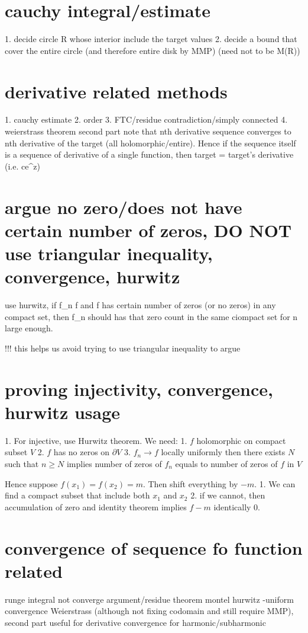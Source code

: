 	
	

\section*{cauchy integral/estimate}
1. decide circle R whose interior include the target values
2. decide a bound that cover the entire circle (and therefore entire disk by MMP) (need not to be M(R))

\section*{derivative related methods}
1. cauchy estimate
2. order
3. FTC/residue contradiction/simply connected
4. weierstrass theorem second part 
   note that nth derivative sequence converges to nth derivative of the target (all holomorphic/entire). Hence if the sequence itself is a sequence of derivative of a single function, then target = target's derivative (i.e. ce^z)
   
   
\section*{argue no zero/does not have certain number of zeros, DO NOT use triangular inequality, convergence, hurwitz}
use hurwitz, if f_n \to f and f has certain number of zeros (or no zeros) in any compact set, then f_n should has that zero count in the same ciompact set for n large enough.



!!! this helps us avoid trying to use triangular inequality to argue   
\section*{proving injectivity, convergence, hurwitz usage}

1. For injective, use Hurwitz theorem. We need:
	1. $f$ holomorphic on compact subset $V$
    2. $f$ has no zeros on $\partial V$
	3. $f_n \to f$ locally uniformly
then there exists $N$ such that 
	$n \geq N$ implies number of zeros of $f_n$ equals to number of zeros of $f$ in $V$ 

	Hence suppose $f(x_1)=f(x_2)=m$. Then shift everything by $-m$.
	1. We can find a compact subset that include both $x_1$ and $x_2$ 
    2. if we cannot, then accumulation of zero and identity theorem implies $f-m$ identically 0.


\section*{convergence of sequence fo function related}
    runge
    integral not converge argument/residue theorem
    montel
    hurwitz
    \epsilon-\delta uniform convergence
    Weierstrass (although not fixing codomain and still require MMP), second part useful for derivative
    convergence for harmonic/subharmonic


